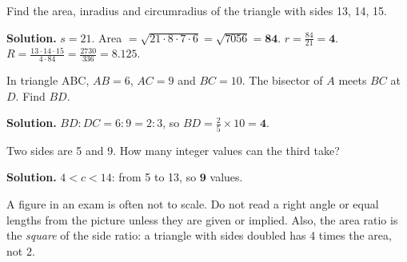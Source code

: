 \documentclass[11pt,a4paper,openany]{report}
\begin{document}
\begin{center}
\end{center}

\begin{example}
Find the area, inradius and circumradius of the triangle with sides 13, 14, 15.

\textbf{Solution.} $s=21$. Area $=\sqrt{21\cdot8\cdot7\cdot6}=\sqrt{7056}=\mathbf{84}$. $r=\frac{84}{21}=\mathbf{4}$. $R=\frac{13\cdot14\cdot15}{4\cdot84}=\frac{2730}{336}=\mathbf{8.125}$.
\end{example}

\begin{example}
In triangle ABC, $AB=6$, $AC=9$ and $BC=10$. The bisector of $A$ meets $BC$ at $D$. Find $BD$.

\textbf{Solution.} $BD:DC=6:9=2:3$, so $BD=\frac25\times10=\mathbf{4}$.
\end{example}

\begin{example}
Two sides are 5 and 9. How many integer values can the third take?

\textbf{Solution.} $4<c<14$: from 5 to 13, so $\mathbf{9}$ values.
\end{example}

\begin{trap}
A figure in an exam is often not to scale. Do not read a right angle or equal lengths from the picture unless they are given or implied. Also, the area ratio is the \emph{square} of the side ratio: a triangle with sides doubled has 4 times the area, not 2.
\end{trap}
\end{document}

